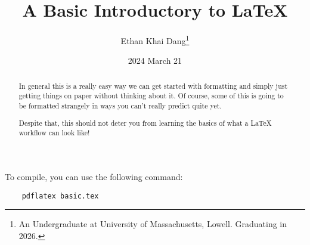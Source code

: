 \documentclass{article}
\title{A Basic Introductory to LaTeX}
\author{Ethan Khai Dang\thanks{An Undergraduate at University of Massachusetts, Lowell. Graduating in 2026.}}
\date{2024 March 21}
\begin{document}
\maketitle
\thispagestyle{empty} %
\newpage

\begin{abstract}
    In general this is a really easy way we can get started with formatting and simply just getting things on paper without thinking about it.
    Of course, some of this is going to be formatted strangely in ways you can't really predict quite yet.

    Despite that, this should not deter you from learning the basics of what a LaTeX workflow can look like!
\end{abstract}

To compile, you can use the following command:
\begin{verbatim}
    pdflatex basic.tex
\end{verbatim}
\end{document}
